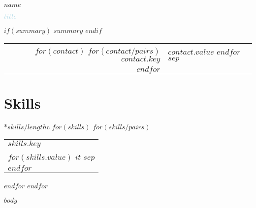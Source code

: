 \documentclass[10pt]{article}
\begin{document}
{\Huge \textbf{$name$}}

{\Large \textcolor{lightblue}{$title$}}

$if(summary)$
{\normalsize $summary$}
$endif$

\bigskip

\begin{tabular}{r l}
    $for(contact)$
        $for(contact/pairs)$
        \textbf{$contact.key$} & $contact.value$
        $endfor$
        $sep$\\
    $endfor$
\end{tabular}

\section*{Skills}
\begin{tabular}{*{$skills/length$}{c}}
    $for(skills)$
        $for(skills/pairs)$
            \begin{tabular}[t]{l}
                \textbf{$skills.key$}\\
                $for(skills.value)$
                    $it$ $sep$\\
                $endfor$
            \end{tabular}
        $endfor$
    $endfor$
\end{tabular}

$body$
\end{document}
